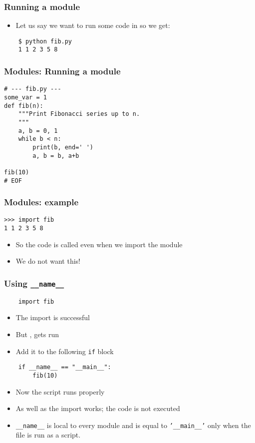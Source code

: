 \documentclass[14pt,compress]{beamer}
\begin{document}
\begin{frame}[fragile]
  \frametitle{Running a module}
  \begin{itemize}
  \item Let us say we want to run some code in  so we get:
  \end{itemize}
  \begin{lstlisting}
    $ python fib.py
    1 1 2 3 5 8
  \end{lstlisting} %

\end{frame}

\begin{frame}[fragile]
  \frametitle{Modules: Running a module}
  \begin{lstlisting}
# --- fib.py ---
some_var = 1
def fib(n):
    """Print Fibonacci series up to n.
    """
    a, b = 0, 1
    while b < n:
        print(b, end=' ')
        a, b = b, a+b

fib(10)
# EOF
  \end{lstlisting}
\end{frame}

\begin{frame}[fragile]
  \frametitle{Modules: example}
  \begin{lstlisting}
>>> import fib
1 1 2 3 5 8
\end{lstlisting}

\begin{itemize}
\item So the code is called even when we import the module
\item We do not want this!
\end{itemize}
\end{frame}

\begin{frame}[fragile]
  \frametitle{Using \texttt{\_\_name\_\_}}
  \begin{lstlisting}
    import fib
  \end{lstlisting}
  \begin{itemize}
  \item The import is successful
  \item But , gets run
    \pause
  \item Add it to the following \texttt{if} block
  \end{itemize}
  \begin{lstlisting}
    if __name__ == "__main__":
        fib(10)
  \end{lstlisting}
  \begin{itemize}
  \item Now the script runs properly
  \item As well as the import works; the code is not executed
  \item \texttt{\_\_name\_\_} is local to every module and is equal
    to \texttt{'\_\_main\_\_'} only when the file is run as a script.
  \end{itemize}
\end{frame}
\end{document}
